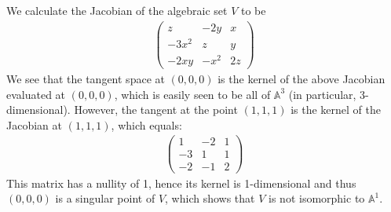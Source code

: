 \documentclass[12pt]{article}
\theoremstyle{definitionstyle}
\newcommand{\A}{\mathbb{A}}
\begin{document}
    We calculate the Jacobian of the algebraic set $V$ to be
    \begin{align*}
        \begin{pmatrix}
            z & -2y & x \\
            -3x^2 & z & y \\
            -2xy & -x^2 & 2z
        \end{pmatrix}
    \end{align*}
    We see that the tangent space at $(0,0,0)$ is the kernel of the above Jacobian evaluated at $(0,0,0)$, which is easily seen to be all of $\A^3$ (in particular, 3-dimensional). However, the tangent at the point $(1,1,1)$ is the kernel of the Jacobian at $(1, 1, 1)$, which equals:
    \begin{align*}
        \begin{pmatrix}
            1 & -2 & 1 \\
            -3 & 1 & 1 \\
            -2 & -1 & 2
        \end{pmatrix}
    \end{align*}
    This matrix has a nullity of 1, hence its kernel is 1-dimensional and thus $(0,0,0)$ is a singular point of $V$, which shows that $V$ is not isomorphic to $\A^1$.
\end{document}
